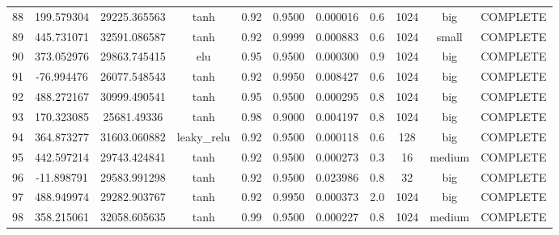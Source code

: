 \begin{longtable}{ccccccccccc}
                       88 &                 199.579304 &                       29225.365563 &            tanh &        0.92 & 0.9500 &       0.000016 &             0.6 &     1024 &       big & COMPLETE \\
                       89 &                 445.731071 &                       32591.086587 &            tanh &        0.92 & 0.9999 &       0.000883 &             0.6 &     1024 &     small & COMPLETE \\
                       90 &                 373.052976 &                       29863.745415 &             elu &        0.95 & 0.9500 &       0.000300 &             0.9 &     1024 &       big & COMPLETE \\
                       91 &                 -76.994476 &                       26077.548543 &            tanh &        0.92 & 0.9950 &       0.008427 &             0.6 &     1024 &       big & COMPLETE \\
                       92 &                 488.272167 &                       30999.490541 &            tanh &        0.95 & 0.9500 &       0.000295 &             0.8 &     1024 &       big & COMPLETE \\
                       93 &                 170.323085 &                        25681.49336 &            tanh &        0.98 & 0.9000 &       0.004197 &             0.8 &     1024 &       big & COMPLETE \\
                       94 &                 364.873277 &                       31603.060882 &     leaky\_relu &        0.92 & 0.9500 &       0.000118 &             0.6 &      128 &       big & COMPLETE \\
                       95 &                 442.597214 &                       29743.424841 &            tanh &        0.92 & 0.9500 &       0.000273 &             0.3 &       16 &    medium & COMPLETE \\
                       96 &                 -11.898791 &                       29583.991298 &            tanh &        0.92 & 0.9500 &       0.023986 &             0.8 &       32 &       big & COMPLETE \\
                       97 &                 488.949974 &                       29282.903767 &            tanh &        0.92 & 0.9950 &       0.000373 &             2.0 &     1024 &       big & COMPLETE \\
                       98 &                 358.215061 &                       32058.605635 &            tanh &        0.99 & 0.9500 &       0.000227 &             0.8 &     1024 &    medium & COMPLETE \\

\end{longtable}
